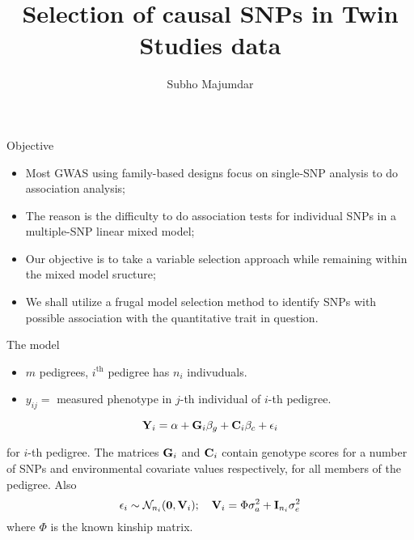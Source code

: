 \documentclass[handout,10pt]{beamer}
\title[Your Short Title]{Selection of causal SNPs in Twin Studies data}
\author{Subho Majumdar}
\begin{document}
\begin{frame}
  \titlepage
\end{frame}


\begin{frame}{Objective}

\begin{itemize}
  \item Most GWAS using family-based designs focus on single-SNP analysis to do association analysis;
  \item The reason is the difficulty to do association tests for individual SNPs in a multiple-SNP linear mixed model;
  \item Our objective is to take a variable selection approach while remaining within the mixed model sructure;
  \item We shall utilize a frugal model selection method to identify SNPs with possible association with the quantitative trait in question.
\end{itemize}

\end{frame}

\begin{frame}{The model}

\begin{itemize}
\item $m$ pedigrees, $i^\text{th}$ pedigree has $n_i$ indivuduals.
\item $y_{ij} = $ measured phenotype in $j$-th individual of $i$-th pedigree.

\end{itemize}

$$ {\bf Y}_i = \alpha + {\bf G}_i {\bf \beta}_g + {\bf C}_i{\bf \beta}_c + {\bf \epsilon}_i$$

for $i$-th pedigree. The matrices ${\bf G}_i$ and ${\bf C}_i$ contain genotype scores for a number of SNPs and environmental covariate values respectively, for all members of the pedigree. Also
%
$$ {\bf \epsilon}_i \sim \mathcal N_{n_i} ({\bf 0}, {\bf V}_i); \quad {\bf V}_i = \Phi \sigma_a^2 + {\bf I}_{n_i} \sigma_e^2 $$
%
where $\Phi$ is the known kinship matrix.
\end{frame}
\end{document}
